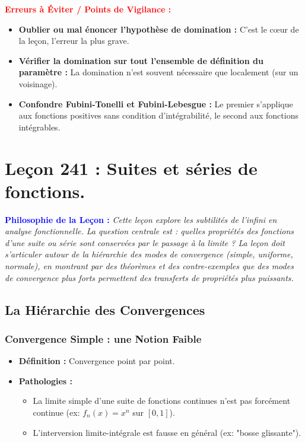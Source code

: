 \documentclass[12pt, a4paper, parskip=full]{report}
\theoremstyle{agregstyle}
\newenvironment{philosophie}
  {\par\medskip\noindent\begin{oframed}\noindent\textbf{\textcolor{blue}{Philosophie de la Leçon :}}\itshape}
  {\end{oframed}\par\medskip}
\newenvironment{erreurs}
  {\par\medskip\noindent\begin{oframed}\noindent\textbf{\textcolor{red}{Erreurs à Éviter / Points de Vigilance :}}}
  {\end{oframed}\par\medskip}
\begin{document}
\begin{erreurs}
    \begin{itemize}
        \item \textbf{Oublier ou mal énoncer l'hypothèse de domination :} C'est le cœur de la leçon, l'erreur la plus grave.
        \item \textbf{Vérifier la domination sur tout l'ensemble de définition du paramètre :} La domination n'est souvent nécessaire que localement (sur un voisinage).
        \item \textbf{Confondre Fubini-Tonelli et Fubini-Lebesgue :} Le premier s'applique aux fonctions positives sans condition d'intégrabilité, le second aux fonctions intégrables.
    \end{itemize}
\end{erreurs}
\chapter{Leçon 241 : Suites et séries de fonctions.}

\begin{philosophie}
    Cette leçon explore les subtilités de l'infini en analyse fonctionnelle. La question centrale est : quelles propriétés des fonctions d'une suite ou série sont conservées par le passage à la limite ? La leçon doit s'articuler autour de la hiérarchie des modes de convergence (simple, uniforme, normale), en montrant par des théorèmes et des contre-exemples que des modes de convergence plus forts permettent des transferts de propriétés plus puissants.
\end{philosophie}

\section{La Hiérarchie des Convergences}
\subsection{Convergence Simple : une Notion Faible}
\begin{itemize}
    \item \textbf{Définition :} Convergence point par point.
    \item \textbf{Pathologies :}
        \begin{itemize}
            \item La limite simple d'une suite de fonctions continues n'est pas forcément continue (ex: $f_n(x)=x^n$ sur $[0,1]$).
            \item L'interversion limite-intégrale est fausse en général (ex: "bosse glissante").
        \end{itemize}
\end{itemize}
\end{document}
